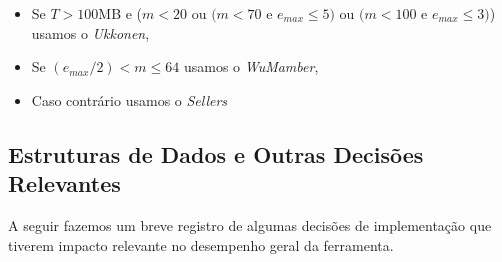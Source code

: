 \documentclass[]{article}
\begin{document}
\begin{itemize}
	\item Se $T > 100$MB e ($m < 20$ ou $(m < 70$ e $e_{max} \leq 5)$ ou $(m < 100$ e $e_{max} \leq 3)$) usamos o \textit{Ukkonen},
	\item Se $(e_{max}/2) < m \leq 64$ usamos o \textit{WuMamber},
	\item Caso contrário usamos o \textit{Sellers}
\end{itemize}

\subsection{Estruturas de Dados e Outras Decisões Relevantes}

A seguir fazemos um breve registro de algumas decisões de implementação que tiverem impacto relevante no desempenho geral da ferramenta.
\end{document}
